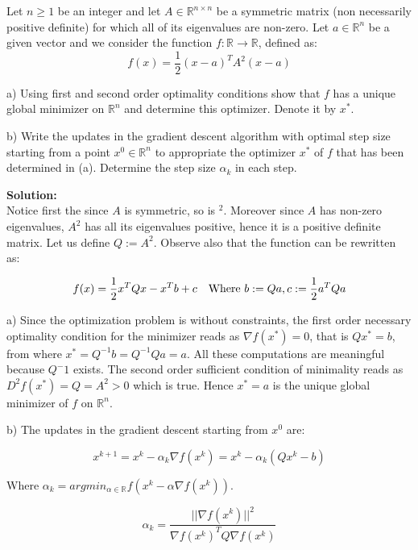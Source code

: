 \documentclass[12pt]{article}
\begin{document}
	Let $n \geq 1$ be an integer and let $A \in \mathbb{R}^{n \times n}$ be a symmetric matrix (non necessarily positive definite) for which all of its eigenvalues are non-zero. Let $a \in \mathbb{R}^n$ be a given vector and we consider the function $f:\mathbb{R} \rightarrow \mathbb{R}$, defined as:
	\begin{equation}
		f(x) = \frac{1}{2}(x-a)^TA^2(x-a)
	\end{equation}
	
	a) Using first and second order optimality conditions show that $f$ has a unique global minimizer on $\mathbb{R}^n$ and determine this optimizer. Denote it by $x^*$.
	
	b) Write the updates in the gradient descent algorithm with optimal step size starting from a point $x^0 \in \mathbb{R}^n$ to appropriate the optimizer $x^*$ of $f$ that has been determined in (a). Determine the step size $\alpha_k$ in each step.
	
	\begin{framed}
		\textbf{Solution:}\\
		Notice first the since $A$ is symmetric, so is $^2$. Moreover since $A$ has non-zero eigenvalues, $A^2$ has all its eigenvalues positive, hence it is a positive definite matrix. Let us define $Q := A^2$. Observe also that the function can be rewritten as:
		
		\begin{equation}
			f(x) = \frac{1}{2}x^TQx - x^Tb + c \text{\quad Where } b := Qa, c := \frac{1}{2}a^TQa
		\end{equation}

		a) Since the optimization problem is without constraints, the first order necessary optimality condition for the minimizer reads as $\nabla f(x^*) = 0$, that is $Qx^* = b$, from where $x^* = Q^{-1}b = Q^{-1}Qa = a$. All these computations are meaningful because $Q^-1$ exists. The second order sufficient condition of minimality reads as $D^2f(x^*) = Q = A^2 > 0$ which is true. Hence $x^* = a$ is the unique global minimizer of $f$ on $\mathbb{R}^n$.
		
		b) The updates in the gradient descent starting from $x^0$ are:
		
		\begin{equation}
			x^{k+1} = x^{k} - \alpha_k \nabla f(x^k) = x^k - \alpha_k (Qx^k - b)
		\end{equation}
		
		Where $\alpha_k = argmin_{\alpha \in \mathbb{R}} f(x^k - \alpha \nabla f(x^k))$. 
		
		\begin{equation}
			\alpha_k = \frac{||\nabla f(x^k)||^2}{\nabla f(x^k)^T Q \nabla f(x^k)}
		\end{equation}

	\end{framed}
	
\end{document}
